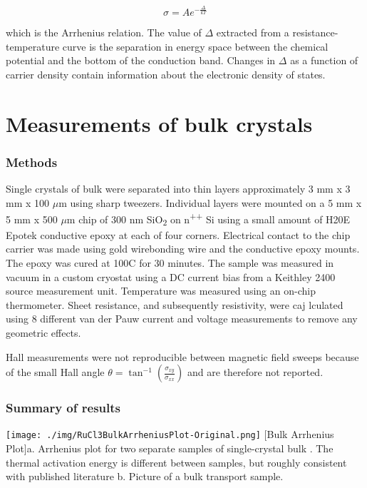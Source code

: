 \begin{equation}
\sigma = A e^{-\frac{\Delta}{kT}}
\end{equation}

which is the Arrhenius relation. The value of $\Delta$ extracted from a resistance-temperature curve is the separation in energy space between the chemical potential and the bottom of the conduction band. Changes in $\Delta$ as a function of carrier density contain information about the electronic density of states.


\section{Measurements of \texorpdfstring{\rucl}{RuCl3}bulk crystals}

\subsubsection{Methods}
Single crystals of bulk \rucl were separated into thin layers approximately 3 mm x 3 mm x 100 $\mu$m using sharp tweezers. Individual layers were mounted on a 5 mm x 5 mm x 500 $\mu$m chip of 300 nm SiO\textsubscript{2} on n\textsuperscript{++} Si using a small amount of H20E Epotek conductive epoxy at each of four corners. Electrical contact to the chip carrier was made using gold wirebonding wire and the conductive epoxy mounts. The epoxy was cured at 100\degree C for 30 minutes. The sample was measured in vacuum in a custom cryostat using a DC current bias from a Keithley 2400 source measurement unit. Temperature was measured using an on-chip thermometer. Sheet resistance, and subsequently resistivity, were caj	lculated using 8 different van der Pauw current and voltage measurements to remove any geometric effects.

Hall measurements were not reproducible between magnetic field sweeps because of the small Hall angle $\theta = \tan^{-1} \left( \frac{\sigma_{xy}}{\sigma_{xx}} \right)$ and are therefore not reported.

\subsubsection{Summary of results}

\begin{centering}
\texttt{[image: ./img/RuCl3BulkArrheniusPlot-Original.png]}
  \captionsetup{width=0.75\textwidth}
  [Bulk \rucl Arrhenius Plot]{a. Arrhenius plot for two separate samples of single-crystal bulk \ruclnospace . The thermal activation energy is different between samples, but roughly consistent with published literature b. Picture of a bulk \rucl transport sample.} 
  \label{fig:ElecTransBulk-01}
\end{centering}

